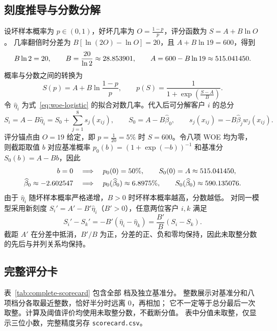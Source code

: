 
\begingroup
\setlength{\intextsep}{6pt}
\setlength{\textfloatsep}{9pt}
\setlength{\abovedisplayskip}{6pt}
\setlength{\belowdisplayskip}{6pt}
\setlength{\abovedisplayshortskip}{3pt}
\setlength{\belowdisplayshortskip}{5pt}

\subsection{刻度推导与分数分解}
设坏样本概率为 $p\in(0,1)$，好坏几率为 $O=\frac{1-p}{p}$，评分函数为 $S=A+B\ln O$。
几率翻倍时分差为 $B[\ln(2O)-\ln O]=20$，且 $A+B\ln 19=600$，得到
\begin{equation}
  B\ln 2=20,\qquad B=\frac{20}{\ln 2}\approx28.853901,\qquad
  A=600-B\ln 19\approx515.041450.
  \label{eq:score-scaling}
\end{equation}
概率与分数之间的转换为
\begin{equation}
  S(p)=A+B\ln\frac{1-p}{p},\qquad
  p(S)=\frac{1}{1+\exp\!\left(\frac{S-A}{B}\right)}.
  \label{eq:score-probability}
\end{equation}
令 $\widehat\eta_i$ 为式~\eqref{eq:woe-logistic} 的拟合对数几率。代入后可分解客户 $i$ 的总分
\begin{equation}
  S_i=A-B\widehat\eta_i=S_0+\sum_{j=1}^{8}s_j(x_{ij}),\qquad
  S_0=A-B\widehat\beta_0,\qquad s_j(x_{ij})=-B\widehat\beta_j w_j(x_{ij}).
  \label{eq:score-decomposition}
\end{equation}
评分锚点由 $O=19$ 给定，即 $p=\tfrac{1}{20}=5\%$ 时 $S=600$。令八项 WOE 均为零，
则截距取值 $b$ 对应基准概率 $p_0(b)=(1+\exp(-b))^{-1}$ 和基准分 $S_0(b)=A-Bb$，因此
\[
  \begin{aligned}
    b=0 &\quad\Longrightarrow\quad p_0(0)=50\%,\qquad S_0(0)=A\approx515.041450,\\
    \widehat\beta_0\approx-2.602547 &\quad\Longrightarrow\quad
    p_0(\widehat\beta_0)\approx6.8975\%,\qquad S_0(\widehat\beta_0)\approx590.135076.
  \end{aligned}
\]
由于 $\widehat\eta_i$ 随坏样本概率严格递增，$B>0$ 时坏样本概率越高，分数越低。
对同一模型采用新刻度 $S_i'=A'-B'\widehat\eta_i$（$B'>0$），任意两位客户 $i,k$ 满足
\[
  S_i'-S_k'=-B'(\widehat\eta_i-\widehat\eta_k)=\frac{B'}{B}(S_i-S_k).
\]
截距 $A'$ 在分差中抵消，$B'/B$ 为正，分差的正、负和零均保持，因此未取整分数的先后与并列关系均保持。

\subsection{完整评分卡}
表~\ref{tab:complete-scorecard} 包含全部 \ScoreCardBins{} 档及独立基准分。
整数展示对基准分和八项档分各取最近整数，恰好半分时远离 0，再相加；
它不一定等于总分最后一次取整。计算及阈值评价均使用未取整分数，不截断分值。
表中分值未取整，仅显示三位小数，完整精度另存 \texttt{scorecard.csv}。

